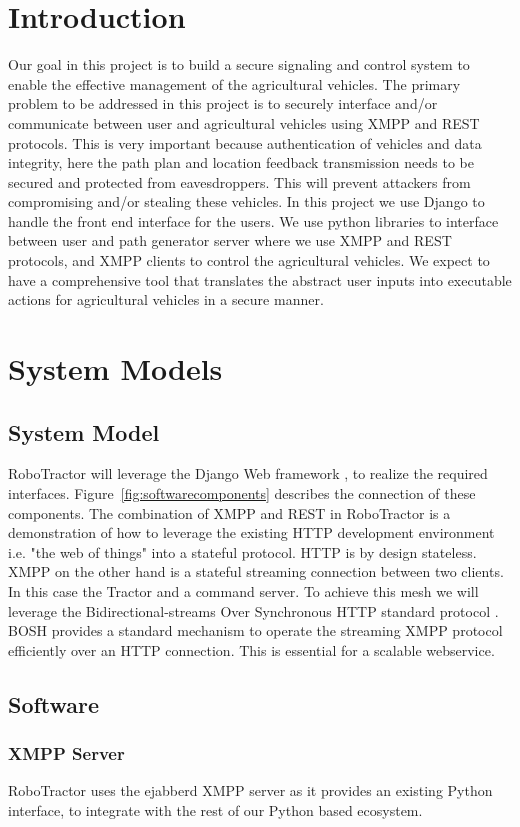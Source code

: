 \documentclass[conference,12pt]{IEEEtran}
\begin{document}
\section{Introduction}
Our goal in this project is to build a secure signaling and control system to
enable the effective management of the agricultural vehicles. The primary
problem to be addressed in this project is to securely interface and/or
communicate between user and agricultural vehicles using XMPP and REST
protocols. This is very important because authentication of vehicles and data
integrity, here the path plan and location feedback transmission needs to be
secured and protected from eavesdroppers. This will prevent attackers from
compromising and/or stealing these vehicles. In this project we use Django to
handle the front end interface for the users. We use python libraries to
interface between user and path generator server where we use XMPP and REST
protocols, and XMPP clients to control the agricultural vehicles. We expect to
have a comprehensive tool that translates the abstract user inputs into
executable actions for agricultural vehicles in a secure manner.
\section{System Models}

\subsection{System Model}
RoboTractor will leverage the Django Web framework \autocite{_django_2014}
, to realize the required
interfaces.  Figure~\ref{fig:softwarecomponents} describes the connection of
these components.  The combination of XMPP and REST in RoboTractor is
a demonstration of how to leverage the existing HTTP development environment
i.e. "the web of things" into a stateful protocol. HTTP is by design
stateless. XMPP on the other hand is a stateful streaming connection between two
clients. In this case the Tractor and a command server.  To achieve this mesh we
will leverage the Bidirectional-streams Over Synchronous HTTP standard
protocol \autocite{paterson_bidirectional-streams_2010}. BOSH provides
a standard mechanism to operate the streaming XMPP protocol efficiently over an
HTTP connection. This is essential for a scalable webservice. 
\subsection{Software}
\subsubsection{XMPP Server}
RoboTractor uses the ejabberd \autocite{_ejabberd} XMPP server as it provides an existing Python
interface, to integrate with the rest of our Python based ecosystem.
\end{document}
